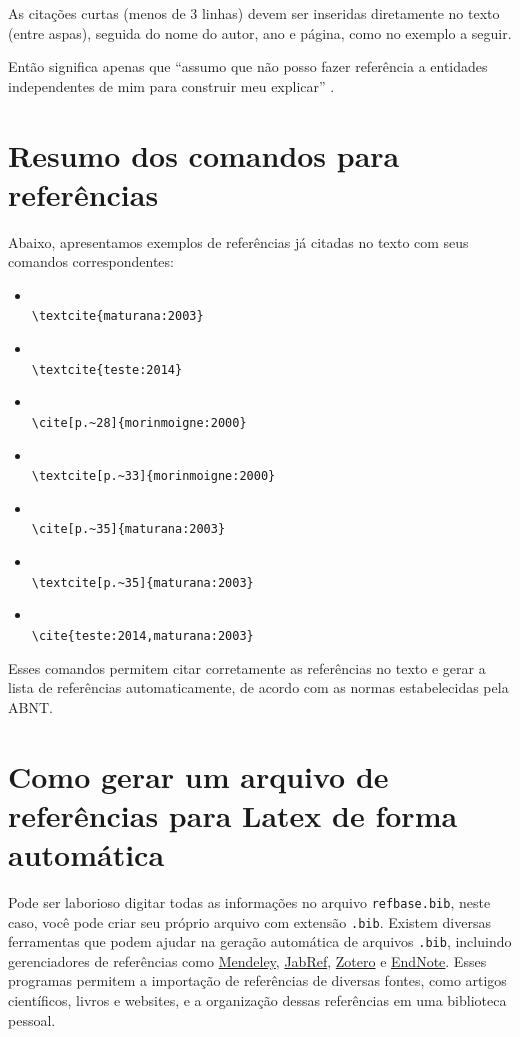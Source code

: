 As citações curtas (menos de 3 linhas) devem ser inseridas diretamente no texto (entre aspas), seguida do nome do autor, ano e página, como no exemplo a seguir.

Então significa apenas que ``assumo que não posso fazer referência a entidades independentes de mim para construir meu explicar'' \cite[p.~35]{maturana:2003}.

\section{Resumo dos comandos para  referências }\label{referenciasUtilizadas}
Abaixo, apresentamos exemplos de referências já citadas no texto com seus comandos correspondentes:
\begin{itemize}
	\item \textcite{maturana:2003}\\ \verb|\textcite{maturana:2003}|
	\item \textcite{teste:2014}\\ \verb|\textcite{teste:2014}|
	\item \cite[p.~28]{morinmoigne:2000}\\ \verb|\cite[p.~28]{morinmoigne:2000}|
	\item \textcite[p.~33]{morinmoigne:2000}\\ \verb|\textcite[p.~33]{morinmoigne:2000}|
	\item \cite[p.~35]{maturana:2003}\\ \verb|\cite[p.~35]{maturana:2003}|
	\item \textcite[p.~35]{maturana:2003}\\ \verb|\textcite[p.~35]{maturana:2003}|
	\item \cite{teste:2014,maturana:2003}\\ \verb|\cite{teste:2014,maturana:2003}|
\end{itemize}

Esses comandos permitem citar corretamente as referências no texto e gerar a lista de referências automaticamente, de acordo com as normas estabelecidas pela ABNT.


\section{Como gerar um arquivo de referências para Latex de forma automática}
Pode ser laborioso  digitar todas as informações no arquivo \verb|refbase.bib|, neste caso, você pode criar seu próprio arquivo com extensão \verb|.bib|. Existem diversas ferramentas que podem ajudar na geração automática de arquivos \verb|.bib|, incluindo gerenciadores de referências como \href{https://www.mendeley.com}{Mendeley}, \href{https://www.jabref.org}{JabRef}, \href{https://www.zotero.org}{Zotero} e \href{https://endnote.com}{EndNote}. Esses programas permitem a importação de referências de diversas fontes, como artigos científicos, livros e websites, e a organização dessas referências em uma biblioteca pessoal.

